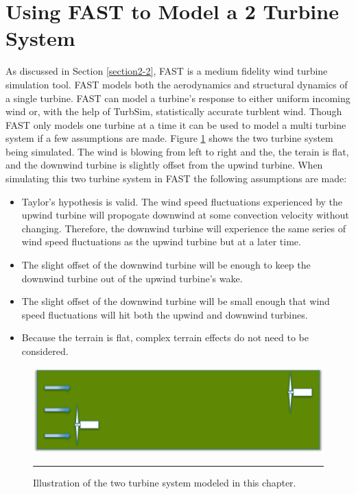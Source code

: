 
\section{Using FAST to Model a 2 Turbine System}

As discussed in Section \ref{section2-2}, FAST is a medium fidelity wind turbine simulation tool. FAST models both the aerodynamics and structural dynamics of a single turbine. FAST can model a turbine's response to either uniform incoming wind or, with the help of TurbSim, statistically accurate turblent wind. Though FAST only models one turbine at a time it can be used to model a multi turbine system if a few assumptions are made. Figure \ref{fig3-5} shows the two turbine system being simulated. The wind is blowing from left to right and the, the terain is flat, and the downwind turbine is slightly offset from the upwind turbine. When simulating this two turbine system in FAST the following assumptions are made:

\begin{itemize}
  \item Taylor's hypothesis is valid. The wind speed fluctuations experienced by the upwind turbine will propogate downwind at some convection velocity without changing. Therefore, the downwind turbine will experience the same series of wind speed fluctuations as the upwind turbine but at a later time.
  \item The slight offset of the downwind turbine will be enough to keep the downwind turbine out of the upwind turbine's wake.
  \item The slight offset of the downwind turbine will be small enough that wind speed fluctuations will hit both the upwind and downwind turbines.
  \item Because the terrain is flat, complex terrain effects do not need to be considered.
\end{itemize}


 \begin{figure}[htbp]
	\centering
		\includegraphics[width=\linewidth]{Figures/ch3Figures/fig3-5.png}
		\rule{35em}{0.5pt}
	\caption{Illustration of the two turbine system modeled in this chapter.}
	\label{fig3-5}
\end{figure}

